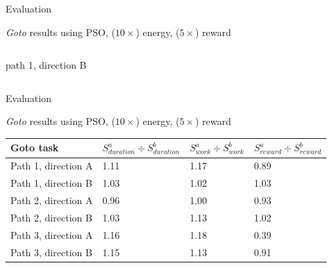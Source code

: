 \documentclass[9pt]{beamer}
\begin{document}
\begin{frame}{Evaluation}
\begin{block}{\textit{Goto} results using PSO, ($10\times$) energy, ($5\times$) reward}
\begin{columns}
\begin{column}{0.33\textwidth}
\begin{center}
                    \newline
                    \tiny{path 1, direction B}
                \end{center}
            \end{column}
        \end{columns}
    \end{block}
\end{frame}

\begin{frame}{Evaluation}
    \begin{block}{\textit{Goto} results using PSO, ($10\times$) energy, ($5\times$) reward} \small
        \begin{table}[H]
            \begin{tabular}{|l|l|l|l|}
                \hline
                Goto task & $S^a_{duration} \div S^b_{duration}$ & $S^a_{work} \div S^b_{work}$ & $S^a_{reward} \div S^b_{reward}$ \\
                \hline
                Path 1, direction A & 1.11 & 1.17 & 0.89 \\
                \hline
                Path 1, direction B & 1.03 & 1.02 & 1.03 \\
                \hline
                Path 2, direction A & 0.96 & 1.00 & 0.93 \\
                \hline
                Path 2, direction B & 1.03 & 1.13 & 1.02 \\
                \hline
                Path 3, direction A & 1.16 & 1.18 & 0.39 \\
                \hline
                Path 3, direction B &  1.15 & 1.13 & 0.91 \\
                \hline
            \end{tabular}
        \end{table}
    \end{block}
\end{frame}
\end{document}
